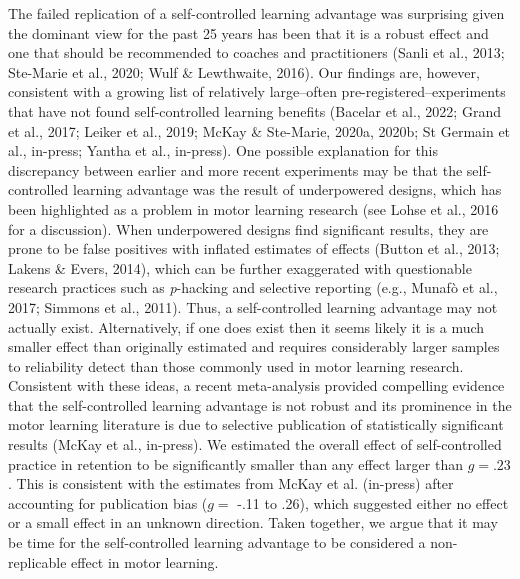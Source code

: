 \documentclass[
  doc, donotrepeattitle,floatsintext]{apa7}
\begin{document}
The failed replication of a self-controlled learning advantage was surprising given the dominant view for the past 25 years has been that it is a robust effect and one that should be recommended to coaches and practitioners (Sanli et al., 2013; Ste-Marie et al., 2020; Wulf \& Lewthwaite, 2016). Our findings are, however, consistent with a growing list of relatively large--often pre-registered--experiments that have not found self-controlled learning benefits (Bacelar et al., 2022; Grand et al., 2017; Leiker et al., 2019; McKay \& Ste-Marie, 2020a, 2020b; St Germain et al., in-press; Yantha et al., in-press). One possible explanation for this discrepancy between earlier and more recent experiments may be that the self-controlled learning advantage was the result of underpowered designs, which has been highlighted as a problem in motor learning research (see Lohse et al., 2016 for a discussion). When underpowered designs find significant results, they are prone to be false positives with inflated estimates of effects (Button et al., 2013; Lakens \& Evers, 2014), which can be further exaggerated with questionable research practices such as \emph{p}-hacking and selective reporting (e.g., Munafò et al., 2017; Simmons et al., 2011). Thus, a self-controlled learning advantage may not actually exist. Alternatively, if one does exist then it seems likely it is a much smaller effect than originally estimated and requires considerably larger samples to reliability detect than those commonly used in motor learning research. Consistent with these ideas, a recent meta-analysis provided compelling evidence that the self-controlled learning advantage is not robust and its prominence in the motor learning literature is due to selective publication of statistically significant results (McKay et al., in-press). We estimated the overall effect of self-controlled practice in retention to be significantly smaller than any effect larger than \(g = .23\). This is consistent with the estimates from McKay et al. (in-press) after accounting for publication bias (\(g =\) -.11 to .26), which suggested either no effect or a small effect in an unknown direction. Taken together, we argue that it may be time for the self-controlled learning advantage to be considered a non-replicable effect in motor learning.
\end{document}
